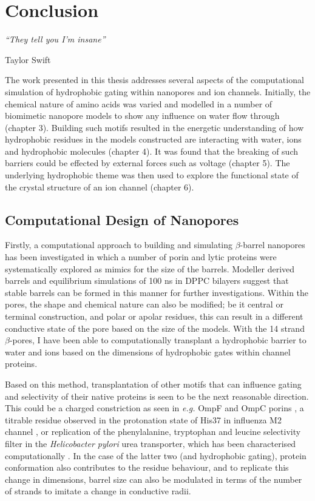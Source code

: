 \chapter{Conclusion}
\label{ch:Conclusion}

\epigraph{{\textit{``They tell you I'm insane''}}}{Taylor Swift}

The work presented in this thesis addresses several aspects of the computational simulation of hydrophobic gating within nanopores and ion channels. Initially, the chemical nature of amino acids was varied and modelled in a number of biomimetic nanopore models to show any influence on water flow through (chapter 3). Building such motifs resulted in the energetic understanding of how hydrophobic residues in the models constructed are interacting with water, ions and hydrophobic molecules (chapter 4). It was found that the breaking of such barriers could be effected by external forces such as voltage (chapter 5). The underlying hydrophobic theme was then used to explore the functional state of the crystal structure of an ion channel (chapter 6).

\section{Computational Design of Nanopores}

Firstly, a computational approach to building and simulating $\beta$-barrel nanopores has been investigated in which a number of porin and lytic proteins were systematically explored as mimics for the size of the barrels. Modeller derived barrels and equilibrium simulations of 100 ns in DPPC bilayers suggest that stable barrels can be formed in this manner for further investigations. Within the pores, the shape and chemical nature can also be modified; be it central or terminal construction, and polar or apolar residues, this can result in a different conductive state of the pore based on the size of the models. With the 14 strand $\beta$-pores, I have been able to computationally transplant a hydrophobic barrier to water and ions based on the dimensions of hydrophobic gates within channel proteins. 

Based on this method, transplantation of other motifs that can influence gating and selectivity of their native proteins is seen to be the next reasonable direction. This could be a charged constriction as seen in \textit{e.g.} OmpF and OmpC porins \cite{Kumar2010}, a titrable residue observed in the protonation state of His37 in influenza M2 channel \cite{Cross2012}, or replication of the phenylalanine, tryptophan and leucine selectivity filter in the \textit{Helicobacter pylori} urea transporter, which has been characterised computationally \cite{McNulty2013}. In the case of the latter two (and hydrophobic gating), protein conformation also contributes to the residue behaviour, and to replicate this change in dimensions, barrel size can also be modulated in terms of the number of strands to imitate a change in conductive radii. 

